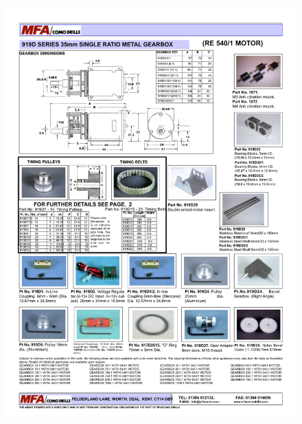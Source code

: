 \begin{figure}
    \section*{}
    \includegraphics[height=\textheight,trim={1cm 0 0 0}]{Files/919Dseries_2}
\end{figure}

